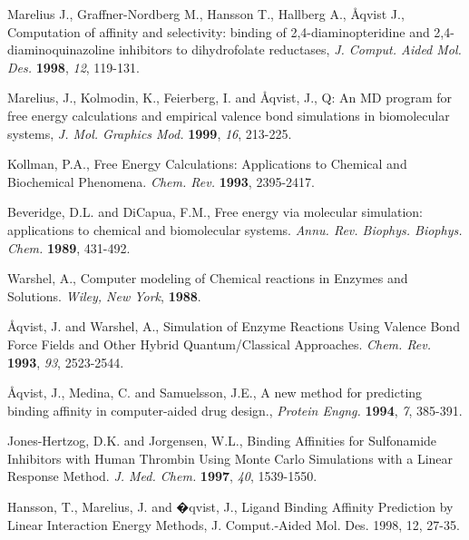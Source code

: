 \documentclass[a4paper,10pt]{article}
\begin{document}
\begin{thebibliography}{2}

  
Marelius J., Graffner-Nordberg M., Hansson T., Hallberg A., \AA qvist J.,
Computation of affinity and selectivity: binding of 2,4-diaminopteridine and
2,4-diaminoquinazoline inhibitors to dihydrofolate reductases,
\textit{J. Comput. Aided Mol. Des.} \textbf{1998}, \textit{12}, 119-131.
  
Marelius, J.,  Kolmodin, K., Feierberg,  I. and
\AA qvist,  J.,
Q: An  MD  program  for  free energy  calculations  and
empirical   valence  bond   simulations  in   biomolecular  systems,
\textit{J. Mol. Graphics Mod.} \textbf{1999}, \textit{16}, 213-225.

Kollman, P.A.,
Free Energy Calculations: Applications to Chemical and Biochemical
Phenomena.
\textit{Chem. Rev.} \textbf{1993}, 2395-2417.

Beveridge, D.L. and DiCapua, F.M.,
Free energy via molecular simulation: applications to chemical and
biomolecular systems.
\textit{Annu. Rev. Biophys. Biophys. Chem.} \textbf{1989}, 431-492.

Warshel, A.,
Computer modeling of Chemical reactions in Enzymes and Solutions.
\textit{Wiley, New York}, \textbf{1988}.

\AA qvist, J. and Warshel, A.,
Simulation of Enzyme Reactions Using Valence Bond Force Fields
and Other Hybrid Quantum/Classical Approaches.
\textit{Chem. Rev.} \textbf{1993}, \textit{93}, 2523-2544.

\AA qvist, J., Medina, C. and Samuelsson, J.E.,
A new method for predicting binding affinity in computer-aided drug
design.,
\textit{Protein Engng.} \textbf{1994}, \textit{7}, 385-391.

Jones-Hertzog, D.K. and Jorgensen, W.L.,
Binding Affinities for Sulfonamide Inhibitors with Human Thrombin
Using Monte Carlo Simulations with a Linear Response Method.
\textit{J. Med. Chem.} \textbf{1997}, \textit{40}, 1539-1550.

Hansson, T., Marelius, J. and �qvist, J., Ligand Binding Affinity
Prediction by Linear Interaction Energy Methods, J. Comput.-Aided
Mol. Des. 1998, 12, 27-35.


\end{thebibliography}
\end{document}

